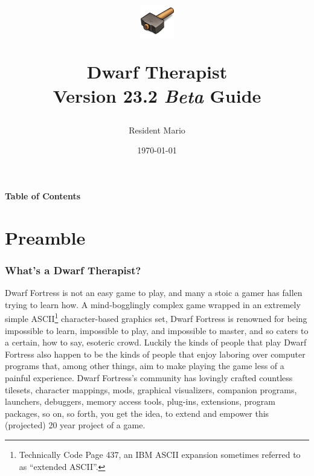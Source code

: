 \documentclass[]{article}
\begin{document}

\title{ \begin{figure}[h!] \centering \includegraphics[scale=.8]{logo}
\end{figure}
\textbf{Dwarf Therapist}\\Version 23.2 \emph{Beta} Guide}
\author{Resident Mario}
\date{\today}
\maketitle

\newpage
{}
\begin{center}
\textbf{Table of Contents}
\end{center}
\tableofcontents
\newpage

\part{Preamble}
\section{What's a Dwarf Therapist?}

Dwarf Fortress is not an easy game to play, and many a stoic a gamer has fallen trying to learn how. A
mind-bogglingly complex game wrapped in an extremely simple ASCII\footnote{Technically Code Page 437, an
IBM ASCII expansion sometimes referred to as ``extended ASCII''.} character-based graphics set, Dwarf
Fortress is renowned for being impossible to learn, impossible to play, and impossible to master, and so
caters to a certain, how to say, esoteric crowd.
Luckily the kinds of people that play Dwarf Fortress also happen to be the kinds of people that enjoy
laboring over computer programs that, among other things, aim to make playing the game less of a painful
experience. Dwarf Fortress's community has lovingly crafted countless tilesets, character
mappings, mods, graphical visualizers, companion programs, launchers, debuggers, memory access tools,
plug-ins, extensions, program packages, so on, so forth, you get the idea, to extend and empower this
(projected) 20 year project of a game.
\end{document}
